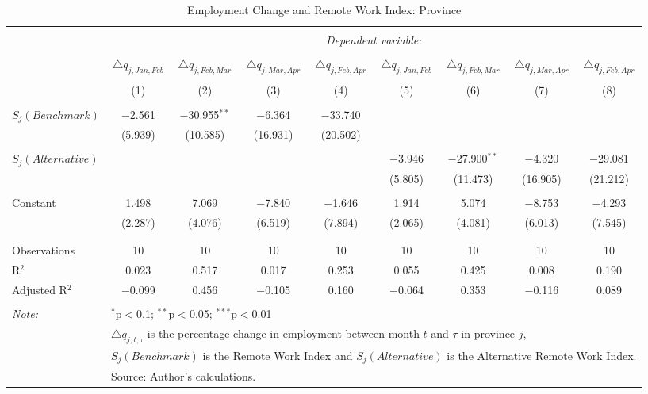 
\begin{table}[!htbp] \centering 
  \caption{Employment Change and Remote Work Index: Province} 
  \label{tab:regression_dynamics_province} 
\footnotesize 
\begin{tabular}{@{\extracolsep{5pt}}lcccccccc} 
\\[-1.8ex]\hline 
\hline \\[-1.8ex] 
 & \multicolumn{8}{c}{\textit{Dependent variable:}} \\ 
\cline{2-9} 
\\[-1.8ex] & $\triangle q_{j,Jan,Feb}$ & $\triangle q_{j,Feb,Mar}$ & $\triangle q_{j,Mar,Apr}$ & $\triangle q_{j,Feb,Apr}$ & $\triangle q_{j,Jan,Feb}$ & $\triangle q_{j,Feb,Mar}$ & $\triangle q_{j,Mar,Apr}$ & $\triangle q_{j,Feb,Apr}$ \\ 
\\[-1.8ex] & (1) & (2) & (3) & (4) & (5) & (6) & (7) & (8)\\ 
\hline \\[-1.8ex] 
 $S_{j}(Benchmark)$ & $-$2.561 & $-$30.955$^{**}$ & $-$6.364 & $-$33.740 &  &  &  &  \\ 
  & (5.939) & (10.585) & (16.931) & (20.502) &  &  &  &  \\ 
  & & & & & & & & \\ 
 $S_{j}(Alternative)$ &  &  &  &  & $-$3.946 & $-$27.900$^{**}$ & $-$4.320 & $-$29.081 \\ 
  &  &  &  &  & (5.805) & (11.473) & (16.905) & (21.212) \\ 
  & & & & & & & & \\ 
 Constant & 1.498 & 7.069 & $-$7.840 & $-$1.646 & 1.914 & 5.074 & $-$8.753 & $-$4.293 \\ 
  & (2.287) & (4.076) & (6.519) & (7.894) & (2.065) & (4.081) & (6.013) & (7.545) \\ 
  & & & & & & & & \\ 
\hline \\[-1.8ex] 
Observations & 10 & 10 & 10 & 10 & 10 & 10 & 10 & 10 \\ 
R$^{2}$ & 0.023 & 0.517 & 0.017 & 0.253 & 0.055 & 0.425 & 0.008 & 0.190 \\ 
Adjusted R$^{2}$ & $-$0.099 & 0.456 & $-$0.105 & 0.160 & $-$0.064 & 0.353 & $-$0.116 & 0.089 \\ 
\hline 
\hline \\[-1.8ex] 
\textit{Note:}  & \multicolumn{8}{l}{$^{*}$p$<$0.1; $^{**}$p$<$0.05; $^{***}$p$<$0.01} \\ 
 & \multicolumn{8}{l}{$\triangle q_{j,t,\tau}$ is the percentage change in employment between month $t$ and $\tau$ in province $j$,} \\ 
 & \multicolumn{8}{l}{$S_{j} (Benchmark)$ is the Remote Work Index and $S_{j} (Alternative)$ is the Alternative Remote Work Index.} \\ 
 & \multicolumn{8}{l}{Source: Author's calculations.} \\ 
\end{tabular} 
\end{table} 
